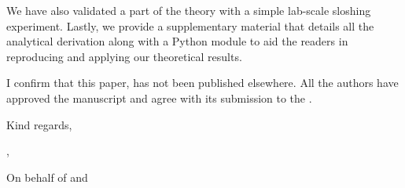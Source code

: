\documentclass{article}
\begin{document}
	We have also validated a part of the theory with a simple lab-scale sloshing experiment. Lastly, we provide a supplementary material that details all the analytical derivation along with a Python module to aid the readers in reproducing and applying our theoretical results. 
	
	I confirm that this paper, has not been published elsewhere. All the authors have approved the manuscript and agree with its submission to the \Journal.
	
	\bigskip
	Kind regards,
	
	\vspace{10pt}
	\AuthorOne,
	
	On behalf of \AuthorTwo \hspace{0.3mm} and\,  \AuthorThree
	
\end{document}
